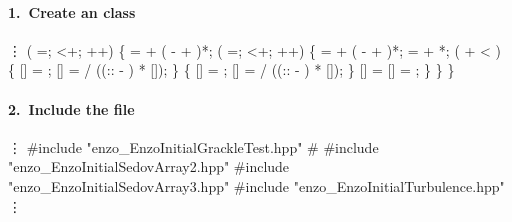 
\begin{frame}[fragile] 
\secframetitle{\ssAddInitial}
\framesubtitle{1.~Create an  class}
\scriptsize
\begin{semiverbatim}
      \vdots
    ( =; <+; ++) \{
        =  + ( -  + )*;
       ( =; <+; ++) \{
           =  + ( -  + )*;
           =  + *;
          ( +  < ) \{
            []  = ;
            [] =  / ((:: - ) * []);
         \}  \{
            []  = ;
            [] =  / ((:: - ) * []);
         \}
         [] = [] = ;
      \}
   \}
\}
\end{semiverbatim}
\end{frame}


\begin{frame}[fragile] 
\secframetitle{\ssAddInitial}
\framesubtitle{2.~Include the  file}

%
\begin{semiverbatim}
       \vdots
   #include "enzo_EnzoInitialGrackleTest.hpp"
   # 
   #include "enzo_EnzoInitialSedovArray2.hpp"
   #include "enzo_EnzoInitialSedovArray3.hpp"
   #include "enzo_EnzoInitialTurbulence.hpp"
       \vdots
\end{semiverbatim}


\end{frame}


